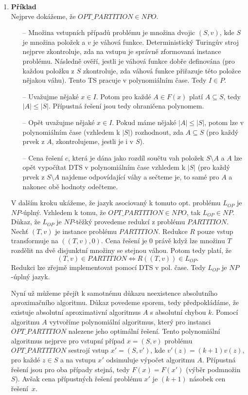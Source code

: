 \documentclass[a4paper,12pt]{article}
\begin{document}
\begin{enumerate}[label=\textbf{\arabic*}.]
 \item {\bfseries Příklad}\\
  Nejprve dokážeme, že $OPT\_PARTITION \in NPO$.
  \begin{itemize}
   \item[--] Množina vstupních případů problému je množina dvojic $(S, v)$, kde $S$ je množina položek a $v$ je váhová funkce.
    Deterministický Turingův stroj nejprve zkontroluje, zda na vstupu je správně zformovaná instance problému. Následně ověří,
    jestli je váhová funkce dobře definována (pro každou položku z $S$ zkontroluje, zda váhová funkce přiřazuje této položce 
    nějakou váhu). Tento TS pracuje v polynomiálním čase. Tedy $I\in P$.
   \item[--] Uvažujme nějaké $x\in I$. Potom pro každé $A\in F(x)$ platí $A\subseteq S$, tedy $|A| \leq |S|$. Přípustná řešení
    jsou tedy ohraničena polynomem.
   \item[--] Opět uvažujme nějaké $x\in I$. Pokud máme nějaké $|A|\leq |S|$, potom lze v polynomiálním čase (vzhledem k $|S|$) rozhodnout, zda
    $A\subseteq S$ (pro každý prvek z $A$, zkontrolujeme, jestli je i v $S$).
   \item[--] Cena řešení $c$, která je dána jako rozdíl součtu vah položek $S\setminus A$ a $A$ lze opět 
    vypočítat DTS v polynomiálním čase vzhledem k $|S|$ (pro každý prvek z $S\setminus A$ najdeme odpovídající váhy a sečteme je, 
    to samé pro $A$ a nakonec obě hodnoty odečteme.
  \end{itemize}
  V dalším kroku ukážeme, že jazyk asociovaný k tomuto opt. problému $L_{OP}$ je $NP$-úplný. Vzhledem k tomu, že $OPT\_PARTITION \in NPO$,
  tak $L_{OP} \in NP$. Důkaz, že $L_{OP}$ je $NP$-těžký provedeme redukcí z problému $PARTITION$. Nechť $(T,v)$ je instance problému
  $PARTITION$. Redukce $R$ pouze vstup transformuje na $((T,v), 0)$. Cena řešení je 0 právě když lze množinu $T$ rozdělit na dvě 
  disjunktní množiny se stejnou váhou. Potom tedy platí, že
  $$
    (T,v)\in PARTITION \Leftrightarrow R((T,v)) \in L_{OP}.
  $$
  Redukci lze zřejmě implementovat pomocí DTS v pol. čase. Tedy $L_{OP}$ je $NP$-úplný jazyk.
  
  Nyní už můžeme přejít k samotnému důkazu neexistence absolutního aproximačního algoritmu. Důkaz povedeme sporem, tedy předpokládáme, že 
  existuje absolutní aproximativní algoritmus $A$ s absolutní chybou $k$. Pomocí algoritmu $A$ vytvoříme polynomiální algoritmus, který 
  pro instanci $OPT\_PARTITION$ nalezene jeho optimální řešení. Tento polynomiální algoritmus nejprve pro vstupní případ $x = (S,v)$ 
  problému $OPT\_PARTITION$ sestrojí vstup $x' = (S, v')$, kde $v'(z) = (k+1)v(z)$, pro každé $z \in S$ a na vstupu $x'$ odsimuluje 
  výpočet algoritmu $A$. Přípustná řešení jsou pro oba případy stejná, tedy $F(x) = F(x')$ (výběr podmnožin $S$). Avšak cena přípustných 
  řešení problému $x'$ je $(k+1)$ násobek cen řešení~$x$.
  

\end{enumerate}
\end{document}
